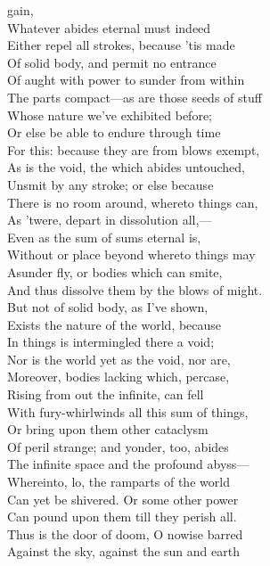 gain,\\
Whatever abides eternal must indeed\\
Either repel all strokes, because 'tis made\\
Of solid body, and permit no entrance\\
Of aught with power to sunder from within\\
The parts compact—as are those seeds of stuff\\
Whose nature we've exhibited before;\\
Or else be able to endure through time\\
For this: because they are from blows exempt,\\
As is the void, the which abides untouched,\\
Unsmit by any stroke; or else because\\
There is no room around, whereto things can,\\
As 'twere, depart in dissolution all,—\\
Even as the sum of sums eternal is,\\
Without or place beyond whereto things may\\
Asunder fly, or bodies which can smite,\\
And thus dissolve them by the blows of might.\\
But not of solid body, as I've shown,\\
Exists the nature of the world, because\\
In things is intermingled there a void;\\
Nor is the world yet as the void, nor are,\\
Moreover, bodies lacking which, percase,\\
Rising from out the infinite, can fell\\
With fury-whirlwinds all this sum of things,\\
Or bring upon them other cataclysm\\
Of peril strange; and yonder, too, abides\\
The infinite space and the profound abyss—\\
Whereinto, lo, the ramparts of the world\\
Can yet be shivered. Or some other power\\
Can pound upon them till they perish all.\\
Thus is the door of doom, O nowise barred\\
Against the sky, against the sun and earth\\
